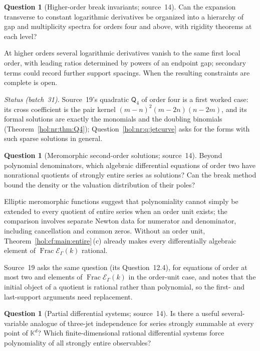 \documentclass[11pt]{article}
\numberwithin{equation}{section}
\theoremstyle{definition}
\newtheorem{question}[theorem]{Question}
\theoremstyle{remark}
\newcommand{\KK}{\mathbb K}
\newcommand{\EK}{\mathcal E_\Gamma(k)}
\newcommand{\FE}{\operatorname{Frac}\EK}
\begin{document}
\begin{question}[Higher-order break invariants; source~14]
\label{hol:ot:q:higher}
Can the expansion transverse to constant logarithmic derivatives be organized
into a hierarchy of gap and multiplicity spectra for orders four and above,
with rigidity theorems at each level?
\end{question}

At higher orders several logarithmic derivatives vanish to the same first
local order, with leading ratios determined by powers of an endpoint gap;
secondary terms could record further support spacings. When the resulting
constraints are complete is open.

\emph{Status (batch~31).} Source~19's quadratic $\mathsf Q_4$ of order four is
a first worked case: its cross coefficient is the pair kernel
$(m-n)^2(m-2n)(n-2m)$, and its formal solutions are exactly the monomials and
the doubling binomials (Theorem~\ref{hol:nr:thm:Q4}); Question~\ref{hol:nr:q:jetcurve}
asks for the forms with such sparse solutions in general.

\begin{question}[Meromorphic second-order solutions; source~14]
\label{hol:ot:q:meromorphic}
Beyond polynomial denominators, which algebraic differential equations of
order two have nonrational quotients of strongly entire series as solutions?
Can the break method bound the density or the valuation distribution of
their poles?
\end{question}

Elliptic meromorphic functions suggest that polynomiality cannot simply be
extended to every quotient of entire series when an order unit exists; the
comparison involves separate Newton data for numerator and denominator,
including cancellation and common zeros. Without an order unit,
Theorem~\ref{hol:cf:main:entire}\,(c) already makes every differentially
algebraic element of $\FE$ rational.

Source~19 asks the same question (its Question~12.4), for equations of order
at most two and elements of $\FE$ in the order-unit case, and notes that the
initial object of a quotient is rational rather than polynomial, so the
first- and last-support arguments need replacement.

\begin{question}[Partial differential systems; source~14]
\label{hol:ot:q:pde}
Is there a useful several-variable analogue of three-jet independence for
series strongly summable at every point of $\KK^d$? Which finite-dimensional
rational differential systems force polynomiality of all strongly entire
observables?
\end{question}
\end{document}
